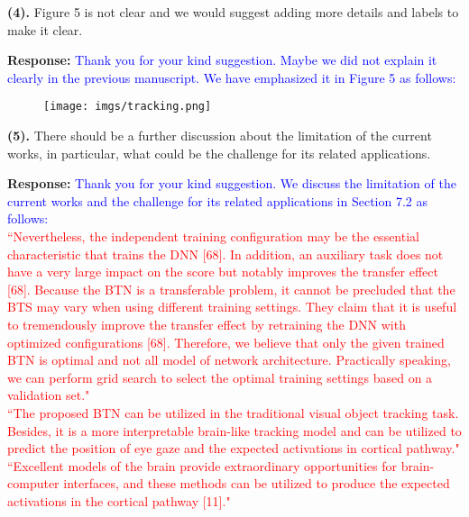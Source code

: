 \documentclass[12pt,journal,onecolumn]{IEEEtran}
\begin{document}
\textbf{(4).} Figure 5 is not clear and we would suggest adding more details and labels to make it clear.

\textbf{Response:} \textcolor{blue}{Thank you for your kind suggestion.
Maybe we did not explain it clearly in the previous manuscript. 
We have emphasized it in Figure 5 as follows:
}
\begin{figure}[H]
	\centering 
	\texttt{[image: imgs/tracking.png]}
\end{figure}
\vspace{8pt}



\textbf{(5).} There should be a further discussion about the limitation of the current works, in particular, what could be the challenge for its related applications.

\textbf{Response:} \textcolor{blue}{Thank you for your kind suggestion. 
We discuss the limitation of the current works and the challenge for its related applications in Section 7.2 as follows: 
} \\
\textcolor{red}{
``Nevertheless, the independent training configuration may be the essential characteristic that trains the DNN [68]. In addition, an auxiliary task does not have a very large impact on the score but notably improves the transfer effect [68]. Because the BTN is a transferable problem, it cannot be precluded that the BTS may vary when using different training settings. They claim that it is useful to tremendously improve the transfer effect by retraining the DNN with optimized configurations [68].
Therefore, we believe that only the given trained BTN is optimal and not all model of network architecture. Practically speaking, we can perform grid search to select the optimal training settings based on a validation set."
} \\
\textcolor{red}{
``The proposed BTN can be utilized in the traditional visual object tracking task. Besides, it is a more interpretable brain-like tracking model and can be utilized to predict the position of eye gaze and the expected activations in cortical pathway."
} \\
\textcolor{red}{
``Excellent models of
the brain provide extraordinary opportunities for brain-computer interfaces, and these methods can be utilized to produce the expected activations in the cortical pathway [11]."
} \\
\vspace{8pt}
\end{document}
